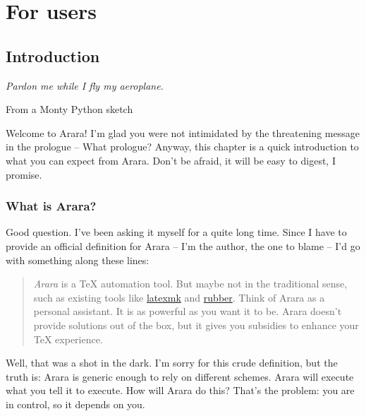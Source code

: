 \documentclass[a4paper,twoside,12pt]{memoir}
\begin{document}
\cleardoublepage

\tableofcontents*

\cleardoublepage

\listofcodes*

\mainmatter

\part{For users}
\label{part:users}

\chapter{Introduction}
\label{chap:intro}

\epigraph{\emph{Pardon me while I fly my aeroplane.}}{From a Monty Python sketch}

Welcome to Arara! I'm glad you were not intimidated by the threatening message in the prologue -- What prologue? Anyway, this chapter is a quick introduction to what you can expect from Arara. Don't be afraid, it will be easy to digest, I promise.

\section{What is Arara?}
\label{sec:whatisarara}

Good question. I've been asking it myself for a quite long time. Since I have to provide an official definition for Arara -- I'm the author, the one to blame -- I'd go with something along these lines:

\begin{quotation}
\noindent\emph{Arara} is a \TeX{} automation tool. But maybe not in the traditional sense, such as existing tools like \href{http://www.phys.psu.edu/~collins/latexmk/}{latexmk} and \href{https://launchpad.net/rubber/}{rubber}. Think of Arara as a personal assistant. It is as powerful as you want it to be. Arara doesn't provide solutions out of the box, but it gives you subsidies to enhance your \TeX{} experience.
\end{quotation}

Well, that was a shot in the dark. I'm sorry for this crude definition, but the truth is: Arara is generic enough to rely on different schemes. Arara will execute what you tell it to execute. How will Arara do this? That's the problem: you are in control, so it depends on you.
\end{document}
